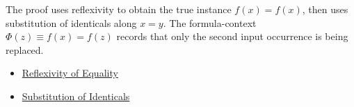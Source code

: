 \begin{remark*}
The proof uses reflexivity to obtain the true instance \(f(x)=f(x)\), then uses
substitution of identicals along \(x=y\). The formula-context
\(\Phi(z)\equiv f(x)=f(z)\) records that only the second input occurrence is
being replaced.
\end{remark*}

\begin{dependencies}
\begin{itemize}
  \item \hyperref[ax:axiomatic-equality-reflexivity]{Reflexivity of Equality}
  \item \hyperref[ax:axiomatic-equality-substitution]{Substitution of Identicals}
\end{itemize}
\end{dependencies}

\clearpage
